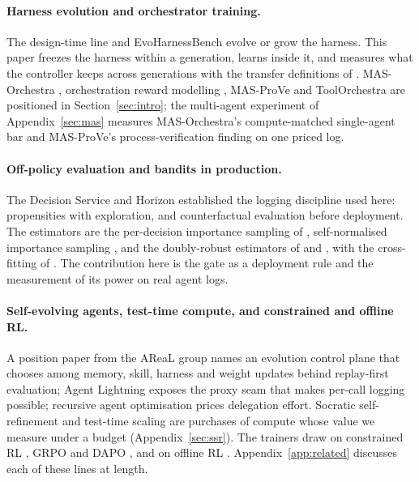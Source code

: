 \documentclass[10pt]{article}
\begin{document}
\paragraph{Harness evolution and orchestrator training.} The design-time line \citep{dgm2025,gepa2025,darwinx2026,metaharness2026,envharness2026,harnessx2026} and EvoHarnessBench \citep{evoharnessbench2026} evolve or grow the harness. This paper freezes the harness within a generation, learns inside it, and measures what the controller keeps across generations with the transfer definitions of \citet{lopezpaz2017gem}. MAS-Orchestra \citep{masorchestra2026}, orchestration reward modelling \citep{rmorchestration2026}, MAS-ProVe \citep{masprove2026} and ToolOrchestra \citep{toolorchestra2025} are positioned in Section~\ref{sec:intro}; the multi-agent experiment of Appendix~\ref{sec:mas} measures MAS-Orchestra's compute-matched single-agent bar and MAS-ProVe's process-verification finding on one priced log.

\paragraph{Off-policy evaluation and bandits in production.} The Decision Service \citep{agarwal2016decisionservice} and Horizon \citep{gauci2018horizon} established the logging discipline used here: propensities with exploration, and counterfactual evaluation before deployment. The estimators are the per-decision importance sampling of \citet{precup2000eligibility}, self-normalised importance sampling \citep{swaminathan2015snips}, and the doubly-robust estimators of \citet{dudik2011dr} and \citet{jiang2016dr}, with the cross-fitting of \citet{chernozhukov2018dml}. The contribution here is the gate as a deployment rule and the measurement of its power on real agent logs.

\paragraph{Self-evolving agents, test-time compute, and constrained and offline RL.} A position paper from the AReaL group \citep{areal2} names an evolution control plane that chooses among memory, skill, harness and weight updates behind replay-first evaluation; Agent Lightning \citep{agentlightning} exposes the proxy seam that makes per-call logging possible; recursive agent optimisation \citep{rao2026} prices delegation effort. Socratic self-refinement \citep{ssr2025} and test-time scaling are purchases of compute whose value we measure under a budget (Appendix~\ref{sec:ssr}). The trainers draw on constrained RL \citep{stooke2020pid,tessler2018rcpo}, GRPO \citep{shao2024grpo} and DAPO \citep{dapo2025}, and on offline RL \citep{kumar2020cql,kostrikov2021iql,peng2019awr}. Appendix~\ref{app:related} discusses each of these lines at length.
\end{document}
